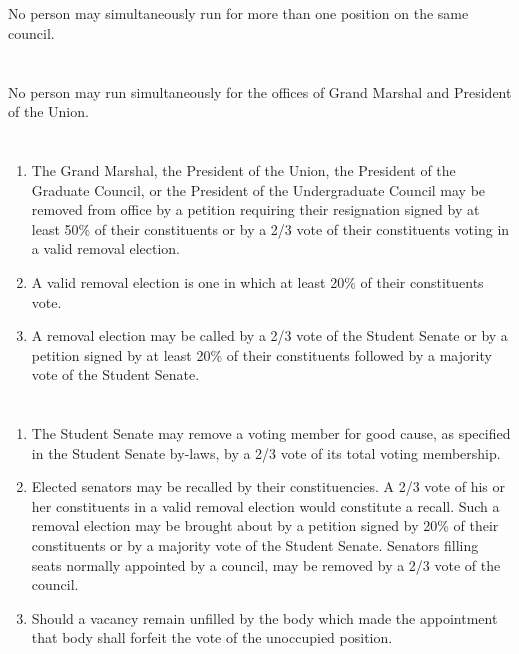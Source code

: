 \documentclass{uniondoc}
\begin{document}
\section{}

No person may simultaneously run for more than one position on the same council.

\section{}

No person may run simultaneously for the offices of Grand Marshal and President of the Union.


\section{}

\begin{enumerate}
	\item The Grand Marshal, the President of the Union, the President of the Graduate Council, or the President of the Undergraduate Council may be removed from office by a petition requiring their resignation signed by at least 50\% of their constituents or by a 2/3 vote of their constituents voting in a valid removal election.
	\item A valid removal election is one in which at least 20\% of their constituents vote.
	\item A removal election may be called by a 2/3 vote of the Student Senate or by a petition signed by at least 20\% of their constituents followed by a majority vote of the Student Senate.
\end{enumerate}

\section{}

\begin{enumerate}
	\item The Student Senate may remove a voting member for good cause, as specified in the Student Senate by-laws, by a 2/3 vote of its total voting membership.
	\item Elected senators may be recalled by their constituencies. A 2/3 vote of his or her constituents in a valid removal election would constitute a recall. Such a removal election may be brought about by a petition signed by 20\% of their constituents or by a majority vote of the Student Senate. Senators filling seats normally appointed by a council, may be removed by a 2/3 vote of the council.
	\item Should a vacancy remain unfilled by the body which made the appointment that body shall forfeit the vote of the unoccupied position.
\end{enumerate}
\end{document}
